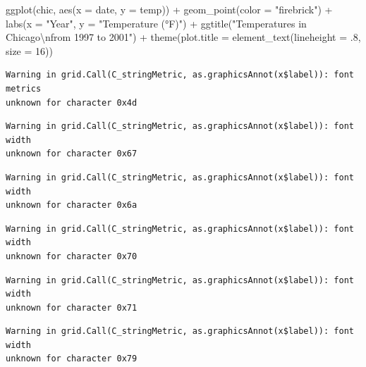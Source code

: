 \documentclass[
  letterpaper,
  DIV=11,
  numbers=noendperiod]{scrreprt}
\newenvironment{Shaded}{\begin{snugshade}}{\end{snugshade}}
\newcommand{\AttributeTok}[1]{\textcolor[rgb]{0.40,0.45,0.13}{#1}}
\newcommand{\DecValTok}[1]{\textcolor[rgb]{0.68,0.00,0.00}{#1}}
\newcommand{\FunctionTok}[1]{\textcolor[rgb]{0.28,0.35,0.67}{#1}}
\newcommand{\NormalTok}[1]{\textcolor[rgb]{0.00,0.23,0.31}{#1}}
\newcommand{\SpecialCharTok}[1]{\textcolor[rgb]{0.37,0.37,0.37}{#1}}
\newcommand{\StringTok}[1]{\textcolor[rgb]{0.13,0.47,0.30}{#1}}
\begin{document}
\begin{Shaded}
\begin{Highlighting}[]
\FunctionTok{ggplot}\NormalTok{(chic, }\FunctionTok{aes}\NormalTok{(}\AttributeTok{x =}\NormalTok{ date, }\AttributeTok{y =}\NormalTok{ temp)) }\SpecialCharTok{+}
  \FunctionTok{geom\_point}\NormalTok{(}\AttributeTok{color =} \StringTok{"firebrick"}\NormalTok{) }\SpecialCharTok{+}
  \FunctionTok{labs}\NormalTok{(}\AttributeTok{x =} \StringTok{"Year"}\NormalTok{, }\AttributeTok{y =} \StringTok{"Temperature (°F)"}\NormalTok{) }\SpecialCharTok{+}
  \FunctionTok{ggtitle}\NormalTok{(}\StringTok{"Temperatures in Chicago}\SpecialCharTok{\textbackslash{}n}\StringTok{from 1997 to 2001"}\NormalTok{) }\SpecialCharTok{+}
  \FunctionTok{theme}\NormalTok{(}\AttributeTok{plot.title =} \FunctionTok{element\_text}\NormalTok{(}\AttributeTok{lineheight =}\NormalTok{ .}\DecValTok{8}\NormalTok{, }\AttributeTok{size =} \DecValTok{16}\NormalTok{))}
\end{Highlighting}
\end{Shaded}

\begin{verbatim}
Warning in grid.Call(C_stringMetric, as.graphicsAnnot(x$label)): font metrics
unknown for character 0x4d
\end{verbatim}

\begin{verbatim}
Warning in grid.Call(C_stringMetric, as.graphicsAnnot(x$label)): font width
unknown for character 0x67
\end{verbatim}

\begin{verbatim}
Warning in grid.Call(C_stringMetric, as.graphicsAnnot(x$label)): font width
unknown for character 0x6a
\end{verbatim}

\begin{verbatim}
Warning in grid.Call(C_stringMetric, as.graphicsAnnot(x$label)): font width
unknown for character 0x70
\end{verbatim}

\begin{verbatim}
Warning in grid.Call(C_stringMetric, as.graphicsAnnot(x$label)): font width
unknown for character 0x71
\end{verbatim}

\begin{verbatim}
Warning in grid.Call(C_stringMetric, as.graphicsAnnot(x$label)): font width
unknown for character 0x79
\end{verbatim}
\end{document}

